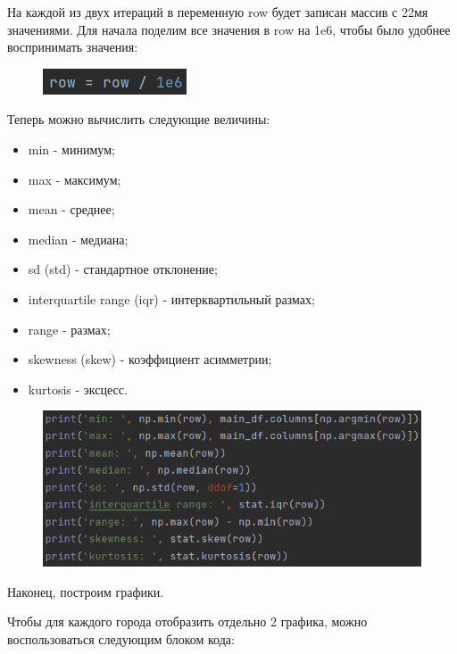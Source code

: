 На каждой из двух итераций в переменную row будет записан массив с 22мя значениями. Для начала поделим все значения в row на 1e6, чтобы было удобнее воспринимать значения:

\begin{figure}[H]
	\begin{center}
		\includegraphics{include/fig/1e6}
	\end{center}
\end{figure}

Теперь можно вычислить следующие величины:

\begin{itemize}
	\item min - минимум;
	\item max - максимум;
	\item mean - среднее;
	\item median - медиана;
	\item sd (std) - стандартное отклонение;
	\item interquartile range (iqr) - интерквартильный размах;
	\item range - размах;
	\item skewness (skew) - коэффициент асимметрии;
	\item kurtosis - эксцесс.
\end{itemize}

\begin{figure}[H]
	\begin{center}
		\includegraphics{include/fig/describe}
	\end{center}
\end{figure}

Наконец, построим графики.

Чтобы для каждого города отобразить отдельно 2 графика, можно воспользоваться следующим блоком кода:

